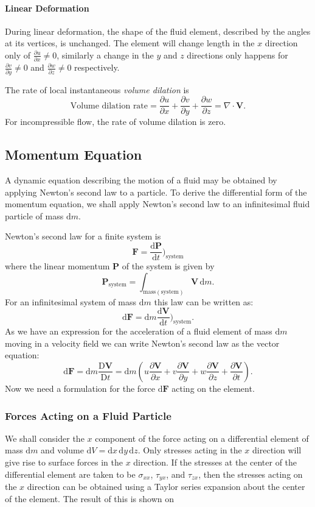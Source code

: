 \paragraph{Linear Deformation}
During linear deformation, the shape of the fluid element, described by the angles at its vertices, is unchanged. The element will change length in the $x$ direction only of $\frac{\partial u}{\partial x} \neq 0$, similarly a change in the $y$ and $z$ directions only happens for $\frac{\partial v}{\partial y} \neq 0$ and $\frac{\partial w}{\partial z} \neq 0$ respectively. 

The rate of local instantaneous \textit{volume dilation} is
\[ 
\text{Volume dilation rate} = \frac{\partial u}{\partial x} + \frac{\partial v}{\partial y} + \frac{\partial w}{\partial z}  = \nabla \cdot \textbf{V}
.\]
For incompressible flow, the rate of volume dilation is zero. 


\subsection{Momentum Equation}
A dynamic equation describing the motion of a fluid may be obtained by applying Newton's second law to a particle. To derive the differential form of the momentum equation, we shall apply Newton's second law to an infinitesimal fluid particle of mass $\mathrm{d}m$. 

Newton's second law for a finite system is
\[ 
\textbf{F} = \frac{\mathrm{d}\textbf{P}}{\mathrm{d}t} \bigg)_{\mathrm{system}}
\]
where the linear momentum $\textbf{P}$ of the system is given by
\[ 
\textbf{P}_{\mathrm{system}} = \int_{\mathrm{mass(system)}} \textbf{V} \, \mathrm{d}m
.\]
For an infinitesimal system of mass $\mathrm{d}m$ this law can be written as:
\[ 
\mathrm{d}\textbf{F} = \mathrm{d}m \frac{\mathrm{d}\textbf{V}}{\mathrm{d}t} \bigg)_{\mathrm{system}}
.\]
As we have an expression for the acceleration of a fluid element of mass $\mathrm{d}m$ moving in a velocity field we can write Newton's second law as the vector equation:
\[ 
\mathrm{d}\textbf{F} = \mathrm{d}m \frac{\mathrm{D}\textbf{V}}{\mathrm{D}t} = \mathrm{d}m \left( u \frac{\partial \textbf{V}}{\partial x}  + v \frac{\partial \textbf{V}}{\partial y} + w \frac{\partial \textbf{V}}{\partial z} + \frac{\partial \textbf{V}}{\partial t}  \right)
.\]
Now we need a formulation for the force $\mathrm{d}\textbf{F}$ acting on the element.


\subsubsection{Forces Acting on a Fluid Particle}
We shall consider the $x$ component of the force acting on a differential element of mass $\mathrm{d}m$ and volume $\mathrm{d}V = \mathrm{d}x \, \mathrm{d}y \, \mathrm{d}z$. Only stresses acting in the $x$ direction will give rise to surface forces in the $x$ direction. If the stresses at the center of the differential element are taken to be $\sigma_{x x}$, $\tau_{yx}$, and $\tau_{zx}$, then the stresses acting on the $x$ direction can be obtained using a Taylor series expansion about the center of the element. The result of this is shown on 

